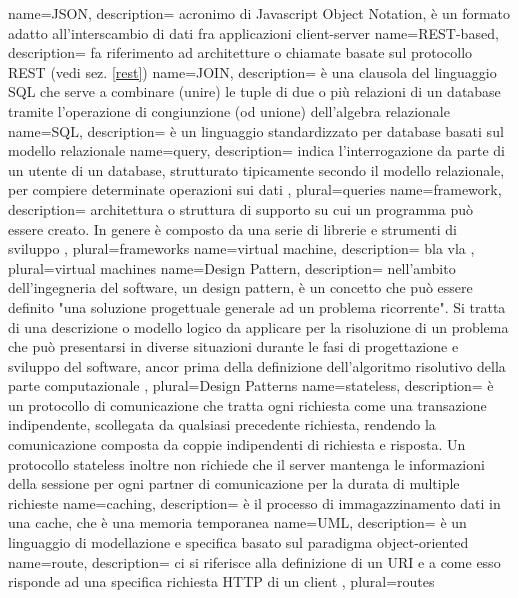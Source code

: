  {
	name=JSON,
	description={  acronimo di Javascript Object Notation, è un formato adatto all'interscambio di dati fra applicazioni client-server
	}
}
 {
	name=REST-based,
	description={ fa riferimento ad architetture o chiamate  basate sul protocollo REST (vedi sez. \ref{rest})
	}
}
 {
	name=JOIN,
	description={  è una clausola del linguaggio SQL che serve a combinare (unire) le tuple di due o più relazioni di un database tramite l'operazione di congiunzione (od unione) dell'algebra relazionale
	}
}
 {
	name=SQL,
	description={ è un linguaggio standardizzato per database basati sul modello relazionale
	}
}
 {
	name=query,
	description={ indica l'interrogazione da parte di un utente di un database, strutturato tipicamente secondo il modello relazionale, per compiere determinate operazioni sui dati
	},
	plural=queries
}
 {
	name=framework,
	description={  architettura o struttura di supporto su cui un programma può essere creato. In genere è composto da una serie di librerie e strumenti di sviluppo
	},
	plural=frameworks
}
 {
	name=virtual machine,
	description={ bla vla %
	},
	plural=virtual machines
}
 {
	name=Design Pattern,
	description={ nell'ambito dell'ingegneria del software, un design pattern, è un concetto che può essere definito "una soluzione progettuale generale ad un problema ricorrente". Si tratta di una descrizione o modello logico da applicare per la risoluzione di un problema che può presentarsi in diverse situazioni durante le fasi di progettazione e sviluppo del software, ancor prima della definizione dell'algoritmo risolutivo della parte computazionale
	},
	plural=Design Patterns
}
 {
	name=stateless,
	description={ è un protocollo di comunicazione che tratta ogni richiesta come una transazione indipendente, scollegata da qualsiasi precedente richiesta, rendendo la comunicazione composta da coppie indipendenti di richiesta e risposta. Un protocollo stateless inoltre non richiede che il server mantenga le informazioni della sessione per ogni partner di comunicazione per la durata di multiple richieste
	}
}
 {
	name=caching,
	description={ è il processo di immagazzinamento dati in una cache, che è una memoria temporanea
	}
}
 {
	name=UML,
	description={ è un linguaggio di modellazione e specifica basato sul paradigma object-oriented
	}
}
 {
	name=route,
	description={ ci si riferisce alla definizione di un URI e a come esso risponde ad una specifica richiesta HTTP di un client
	},
	plural=routes
}
